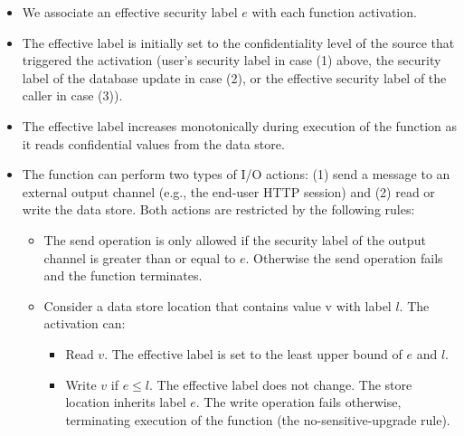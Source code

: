 \begin{itemize}
    \item We associate an effective security label $e$ with each 
        function activation.

    \item The effective label is initially set to the confidentiality 
        level of the source that triggered the activation (user's 
        security label in case (1) above, the security label of the 
        database update in case (2), or the effective security label 
        of the caller in case (3)).

    \item The effective label increases monotonically during execution 
        of the function as it reads confidential values from the data 
        store.

    \item The function can perform two types of I/O actions: (1) send 
        a message to an external output channel (e.g., the end-user 
        HTTP session) and (2) read or write the data store.  Both 
        actions are restricted by the following rules:

        \begin{itemize}
            \item The send operation is only allowed if the security 
                label of the output channel is greater than or equal 
                to $e$. Otherwise the send operation fails and the 
                function terminates.

            \item Consider a data store location that contains value v 
                with label $l$.  The activation can:
                \begin{itemize}
                    \item Read $v$. The effective label is set to the 
                        least upper bound of $e$ and $l$.

                    \item Write $v$ if $e \leq l$. The effective label 
                        does not change. The store location inherits 
                        label $e$.  The write operation fails 
                        otherwise, terminating execution of the 
                        function (the no-sensitive-upgrade rule).
                \end{itemize}
        \end{itemize}
\end{itemize}

